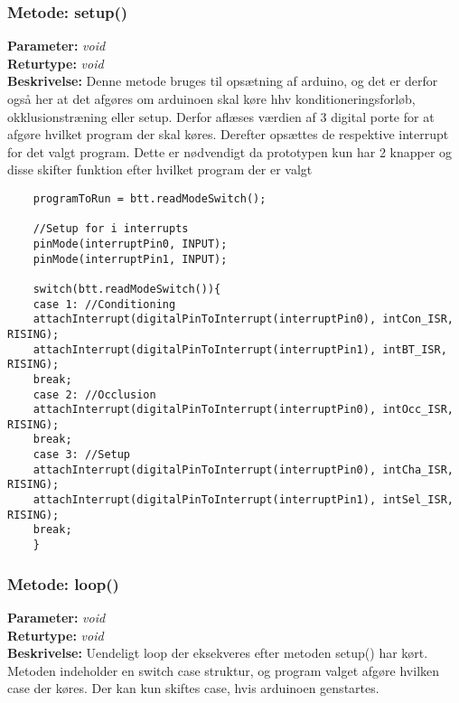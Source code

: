 \subsubsection{Metode: setup()}
\textbf{Parameter: } \textit{void}
\\ \textbf{Returtype: } \textit{void}
\\ \textbf{Beskrivelse: } Denne metode bruges til opsætning af arduino, og det er derfor også her at det afgøres om arduinoen skal køre hhv konditioneringsforløb, okklusionstræning eller setup. Derfor aflæses værdien af 3 digital porte for at afgøre hvilket program der skal køres. Derefter opsættes de respektive interrupt for det valgt program. Dette er nødvendigt da prototypen kun har 2 knapper og disse skifter funktion efter hvilket program der er valgt
\begin{lstlisting}
	programToRun = btt.readModeSwitch();
	
	//Setup for i interrupts
	pinMode(interruptPin0, INPUT);
	pinMode(interruptPin1, INPUT);
	
	switch(btt.readModeSwitch()){
	case 1: //Conditioning
	attachInterrupt(digitalPinToInterrupt(interruptPin0), intCon_ISR, RISING);
	attachInterrupt(digitalPinToInterrupt(interruptPin1), intBT_ISR, RISING);
	break;
	case 2: //Occlusion
	attachInterrupt(digitalPinToInterrupt(interruptPin0), intOcc_ISR, RISING);
	break;
	case 3: //Setup
	attachInterrupt(digitalPinToInterrupt(interruptPin0), intCha_ISR, RISING);
	attachInterrupt(digitalPinToInterrupt(interruptPin1), intSel_ISR, RISING);
	break;
	}
\end{lstlisting}

\subsubsection{Metode: loop()}
\textbf{Parameter: } \textit{void}
\\ \textbf{Returtype: } \textit{void}
\\ \textbf{Beskrivelse: } Uendeligt loop der eksekveres efter metoden setup() har kørt. Metoden indeholder en switch case struktur, og program valget afgøre hvilken case der køres. Der kan kun skiftes case, hvis arduinoen genstartes. 